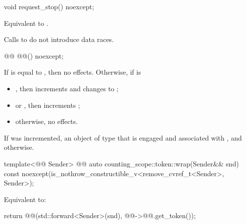 %
\begin{itemdecl}
void request_stop() noexcept;
\end{itemdecl}

\begin{itemdescr}
\pnum
\effects
Equivalent to .

\pnum
\remarks
Calls to  do not introduce data races.
\end{itemdescr}

%
\begin{itemdecl}
@@ @@() noexcept;
\end{itemdecl}

\begin{itemdescr}
\pnum
\effects
If  is equal to ,
then no effects.
Otherwise, if  is
\begin{itemize}
\item
{}, then increments  and
changes  to ;
\item
{} or , then increments ;
\item
otherwise, no effects.
\end{itemize}

\pnum
\returns
If  was incremented,
an object of type 
that is engaged and associated with , and
 otherwise.
\end{itemdescr}

%
\begin{itemdecl}
template<@@ Sender>
  @@ auto counting_scope::token::wrap(Sender&& snd) const
    noexcept(is_nothrow_constructible_v<remove_cvref_t<Sender>, Sender>);
\end{itemdecl}

\begin{itemdescr}
\pnum
\effects
Equivalent to:
\begin{codeblock}
return @@(std::forward<Sender>(snd), @@->@@.get_token());
\end{codeblock}
\end{itemdescr}

